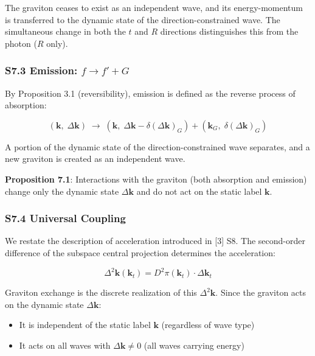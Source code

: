 \documentclass[
  a4paper,11pt]{article}
\providecommand{\tightlist}{%
  \setlength{\itemsep}{0pt}\setlength{\parskip}{0pt}}
\theoremstyle{definition}
\theoremstyle{remark}
\begin{document}
The graviton ceases to exist as an independent wave, and its
energy-momentum is transferred to the dynamic state of the
direction-constrained wave. The simultaneous change in both the \(t\)
and \(R\) directions distinguishes this from the photon (\(R\) only).

\subsubsection{\texorpdfstring{S7.3 Emission:
\(f \to f' + G\)}{S7.3 Emission: f \textbackslash to f\textquotesingle{} + G}}\label{s7.3-emission-f-to-f-g}

By Proposition 3.1 (reversibility), emission is defined as the reverse
process of absorption:

\[(\mathbf{k},\; \Delta\mathbf{k}) \;\longrightarrow\; (\mathbf{k},\; \Delta\mathbf{k} - \delta(\Delta\mathbf{k})_G) + (\mathbf{k}_G,\; \delta(\Delta\mathbf{k})_G)\]

A portion of the dynamic state of the direction-constrained wave
separates, and a new graviton is created as an independent wave.

\textbf{Proposition 7.1}: Interactions with the graviton (both
absorption and emission) change only the dynamic state
\(\Delta\mathbf{k}\) and do not act on the static label \(\mathbf{k}\).

\subsubsection{S7.4 Universal Coupling}\label{s7.4-universal-coupling}

We restate the description of acceleration introduced in {[}3{]} S8. The
second-order difference of the subspace central projection determines
the acceleration:

\[\Delta^2\mathbf{k}(\mathbf{k}_t) = D^2\pi(\mathbf{k}_t) \cdot \Delta\mathbf{k}_t\]

Graviton exchange is the discrete realization of this
\(\Delta^2\mathbf{k}\). Since the graviton acts on the dynamic state
\(\Delta\mathbf{k}\):

\begin{itemize}
\tightlist
\item
  It is independent of the static label \(\mathbf{k}\) (regardless of
  wave type)
\item
  It acts on all waves with \(\Delta\mathbf{k} \neq 0\) (all waves
  carrying energy)
\end{itemize}
\end{document}
